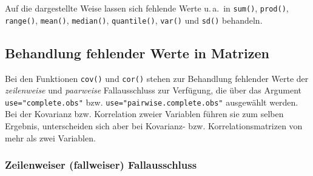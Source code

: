 Auf die dargestellte Weise lassen sich fehlende Werte u.\,a.\ in \lstinline!sum()!, \lstinline!prod()!, \lstinline!range()!, \lstinline!mean()!, \lstinline!median()!, \lstinline!quantile()!, \lstinline!var()! und \lstinline!sd()! behandeln.

\subsection{Behandlung fehlender Werte in Matrizen}
\label{sec:naMat}

Bei den Funktionen \lstinline!cov()! und \lstinline!cor()! stehen zur Behandlung fehlender Werte der \emph{zeilenweise} und \emph{paarweise} Fallausschluss zur Verfügung, die über das Argument \lstinline!use="complete.obs"! bzw. \lstinline!use="pairwise.complete.obs"! ausgewählt werden. Bei der Kovarianz bzw. Korrelation zweier Variablen führen sie zum selben Ergebnis,
unterscheiden sich aber bei Kovarianz- bzw. Korrelationsmatrizen von mehr als zwei Variablen.

\subsubsection{Zeilenweiser (fallweiser) Fallausschluss}

